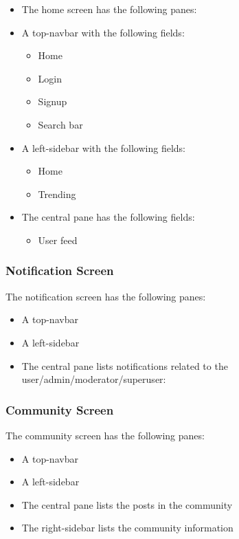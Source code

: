 \documentclass[conference,compsoc]{IEEEtran}
\begin{document}
\begin{itemize}
    \item The home screen has the following panes:

    \item A top-navbar with the following fields:
          \begin{itemize}
              \item Home
              \item Login
              \item Signup
              \item Search bar
          \end{itemize}
    \item A left-sidebar with the following fields:
          \begin{itemize}
              \item Home
              \item Trending
          \end{itemize}
    \item The central pane has the following fields:
          \begin{itemize}
              \item User feed
          \end{itemize}
\end{itemize}

\subsubsection{Notification Screen}
\vspace{0.2cm}
The notification screen has the following panes:
\begin{itemize}
    \item A top-navbar
    \item A left-sidebar
    \item The central pane lists notifications related to the user/admin/moderator/superuser:
\end{itemize}

\subsubsection{Community Screen}
\vspace{0.2cm}
The community screen has the following panes:
\begin{itemize}
    \item A top-navbar
    \item A left-sidebar
    \item The central pane lists the posts in the community
    \item The right-sidebar lists the community information
\end{itemize}
\end{document}
